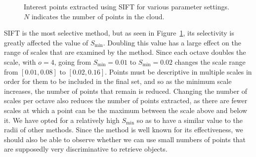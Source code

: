 \documentclass[11pt,a4paper]{kth-mag}
\begin{document}
\begin{figure}
{    
  }
  \caption{Interest points extracted using SIFT for various parameter settings.
    $N$ indicates the number of points in the cloud.}
  \label{fig:intsift}
\end{figure}

SIFT is the most selective method, but as seen in Figure~\ref{fig:intsift}, its
selectivity is greatly affected the value of $S_{\min}$. Doubling this value has
a large effect on the range of scales that are examined by the method. Since
each octave doubles the scale, with $o=4$, going from $S_{\min}=0.01$ to
$S_{\min}=0.02$ changes the scale range from $\left[0.01,0.08\right]$ to
$\left[0.02,0.16\right]$. Points must be descriptive in multiple scales in order
for them to be included in the final set, and so as the minimum scale increases,
the number of points that remain is reduced. Changing the number of scales per
octave also reduces the number of points extracted, as there are fewer scales at
which a point can be the maximum between the scale above and below it. We have
opted for a relatively high $S_{\min}$ so as to have a similar value to the
radii of other methods. Since the method is well known for its effectiveness, we
should also be able to observe whether we can use small numbers of points that
are supposedly very discriminative to retrieve objects.
\end{document}
